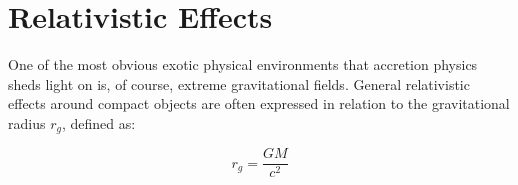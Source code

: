 \section{Relativistic Effects}

\par {}One of the most obvious exotic physical environments that accretion physics sheds light on is, of course, extreme gravitational fields.  General relativistic effects around compact objects are often expressed in relation to the gravitational radius $r_g$, defined as:

\begin{equation}
r_g=\frac{GM}{c^2}
\end{equation}

